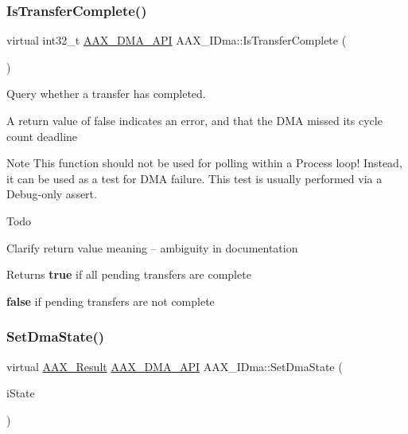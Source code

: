 \subsubsection{\texorpdfstring{IsTransferComplete()}{IsTransferComplete()}}
{\footnotesize\ttfamily virtual int32\+\_\+t \mbox{\hyperlink{a00587_acae60d01e5e4bd3282369d0d9d378f3f}{A\+A\+X\+\_\+\+D\+M\+A\+\_\+\+A\+PI}} A\+A\+X\+\_\+\+I\+Dma\+::\+Is\+Transfer\+Complete (\begin{DoxyParamCaption}{ }\end{DoxyParamCaption})\hspace{0.3cm}{\ttfamily [pure virtual]}}



Query whether a transfer has completed. 

A return value of false indicates an error, and that the D\+MA missed its cycle count deadline

\begin{DoxyNote}{Note}
This function should not be used for polling within a Process loop! Instead, it can be used as a test for D\+MA failure. This test is usually performed via a Debug-\/only assert.
\end{DoxyNote}
\begin{DoxyRefDesc}{Todo}
\item[\mbox{\hyperlink{a00785__todo000048}{Todo}}]Clarify return value meaning -- ambiguity in documentation\end{DoxyRefDesc}


\begin{DoxyReturn}{Returns}
{\bfseries{true}} if all pending transfers are complete 

{\bfseries{false}} if pending transfers are not complete 
\end{DoxyReturn}
\mbox{\label{a01809_a4d1a182655fef78b18d564a5669bae18}} 
\subsubsection{\texorpdfstring{SetDmaState()}{SetDmaState()}}
{\footnotesize\ttfamily virtual \mbox{\hyperlink{a00392_a4d8f69a697df7f70c3a8e9b8ee130d2f}{A\+A\+X\+\_\+\+Result}} \mbox{\hyperlink{a00587_acae60d01e5e4bd3282369d0d9d378f3f}{A\+A\+X\+\_\+\+D\+M\+A\+\_\+\+A\+PI}} A\+A\+X\+\_\+\+I\+Dma\+::\+Set\+Dma\+State (\begin{DoxyParamCaption}\item[{\mbox{\hyperlink{a01809_a64e694fd40d32179e429eb7934a64842}{E\+State}}}]{i\+State }\end{DoxyParamCaption})\hspace{0.3cm}{\ttfamily [pure virtual]}}




